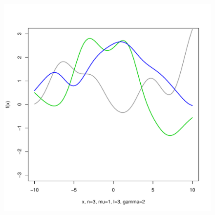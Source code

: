 \documentclass[12pt,letterpaper]{article}
\begin{document}
\begin{figure}
\begin{center}
\includegraphics[scale=0.2]{hw321/n3-m1-l3-g4.pdf}
\end{center}
\end{figure}
\end{document}
